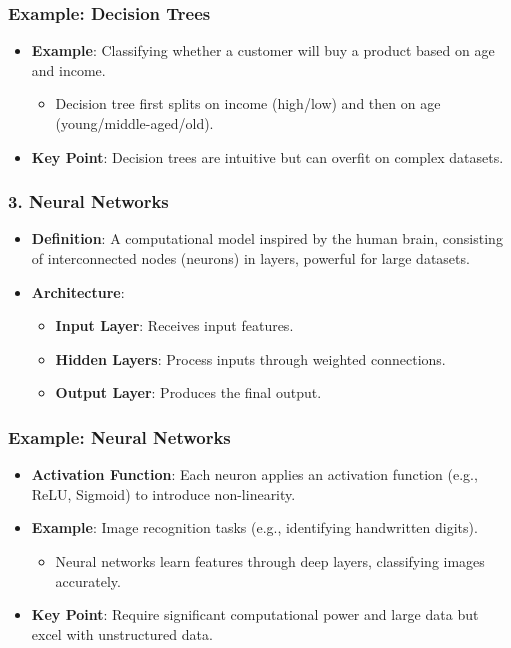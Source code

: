 \documentclass[aspectratio=169]{beamer}
\begin{document}
\begin{frame}[fragile]
    \frametitle{Example: Decision Trees}
    \begin{itemize}
        \item \textbf{Example}: Classifying whether a customer will buy a product based on age and income.
        \begin{itemize}
            \item Decision tree first splits on income (high/low) and then on age (young/middle-aged/old).
        \end{itemize}
        \item \textbf{Key Point}: Decision trees are intuitive but can overfit on complex datasets.
    \end{itemize}
\end{frame}

\begin{frame}[fragile]
    \frametitle{3. Neural Networks}
    \begin{itemize}
        \item \textbf{Definition}: A computational model inspired by the human brain, consisting of interconnected nodes (neurons) in layers, powerful for large datasets.
        \item \textbf{Architecture}:
        \begin{itemize}
            \item \textbf{Input Layer}: Receives input features.
            \item \textbf{Hidden Layers}: Process inputs through weighted connections.
            \item \textbf{Output Layer}: Produces the final output.
        \end{itemize}
    \end{itemize}
\end{frame}

\begin{frame}[fragile]
    \frametitle{Example: Neural Networks}
    \begin{itemize}
        \item \textbf{Activation Function}: Each neuron applies an activation function (e.g., ReLU, Sigmoid) to introduce non-linearity.
        \item \textbf{Example}: Image recognition tasks (e.g., identifying handwritten digits).
        \begin{itemize}
            \item Neural networks learn features through deep layers, classifying images accurately.
        \end{itemize}
        \item \textbf{Key Point}: Require significant computational power and large data but excel with unstructured data.
    \end{itemize}
\end{frame}
\end{document}
